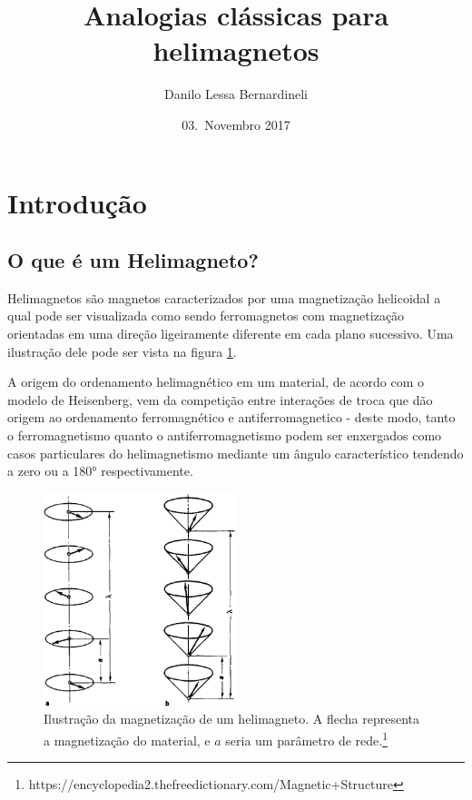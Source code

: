 \documentclass[a4paper, 12pt, twocolumn]{article}
\title{Analogias clássicas para helimagnetos}
\author{Danilo Lessa Bernardineli}
\date{03.~Novembro 2017}
\begin{document}
\begin{strip}
\maketitle

\end{strip}

\section{Introdução}

\subsection{O que é um Helimagneto?}

Helimagnetos são magnetos caracterizados por uma magnetização helicoidal a qual pode ser visualizada como sendo ferromagnetos com magnetização orientadas em uma direção ligeiramente diferente em cada plano sucessivo. Uma ilustração dele pode ser vista na figura \ref{fig:helimagneto}.

A origem do ordenamento helimagnético em um material, de acordo com o modelo de Heisenberg,  vem da competição entre interações de troca que dão origem ao ordenamento ferromagnético e antiferromagnetico - deste modo, tanto o ferromagnetismo quanto o antiferromagnetismo podem ser enxergados como casos particulares do helimagnetismo mediante um ângulo característico tendendo a zero ou a \ang{180} respectivamente. \cite{lecture_29}\cite{helimagnetism-heisenberg-model}

\begin{figure}
    \caption{Ilustração da magnetização de um helimagneto. A flecha representa a magnetização do material, e $a$ seria um parâmetro de rede.\protect\footnote{https://encyclopedia2.thefreedictionary.com/Magnetic+Structure} }
    \centering
    \label{fig:helimagneto}
    \vspace{0pt}
    \includegraphics[width=0.5\textwidth]{heli.png}
\end{figure}
\end{document}
